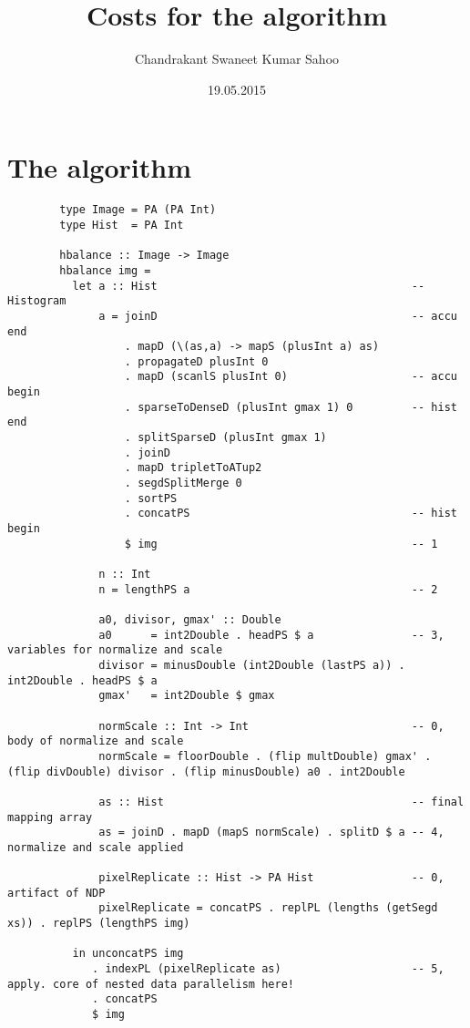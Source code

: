 \documentclass{article}
\title{Costs for the algorithm}
\date{19.05.2015}
\author{Chandrakant Swaneet Kumar Sahoo}
\begin{document}
    
    \section{The algorithm}
      \begin{lstlisting}
        type Image = PA (PA Int)
        type Hist  = PA Int

        hbalance :: Image -> Image
        hbalance img =
          let a :: Hist                                       -- Histogram
              a = joinD                                       -- accu end
                  . mapD (\(as,a) -> mapS (plusInt a) as)
                  . propagateD plusInt 0
                  . mapD (scanlS plusInt 0)                   -- accu begin
                  . sparseToDenseD (plusInt gmax 1) 0         -- hist end
                  . splitSparseD (plusInt gmax 1)
                  . joinD
                  . mapD tripletToATup2
                  . segdSplitMerge 0
                  . sortPS
                  . concatPS                                  -- hist begin
                  $ img                                       -- 1
                      
              n :: Int
              n = lengthPS a                                  -- 2
              
              a0, divisor, gmax' :: Double
              a0      = int2Double . headPS $ a               -- 3, variables for normalize and scale
              divisor = minusDouble (int2Double (lastPS a)) . int2Double . headPS $ a
              gmax'   = int2Double $ gmax
              
              normScale :: Int -> Int                         -- 0, body of normalize and scale
              normScale = floorDouble . (flip multDouble) gmax' . (flip divDouble) divisor . (flip minusDouble) a0 . int2Double
              
              as :: Hist                                      -- final mapping array
              as = joinD . mapD (mapS normScale) . splitD $ a -- 4, normalize and scale applied
              
              pixelReplicate :: Hist -> PA Hist               -- 0, artifact of NDP
              pixelReplicate = concatPS . replPL (lengths (getSegd xs)) . replPS (lengthPS img)
              
          in unconcatPS img
             . indexPL (pixelReplicate as)                    -- 5, apply. core of nested data parallelism here!
             . concatPS
             $ img
      \end{lstlisting}
    
\end{document}
